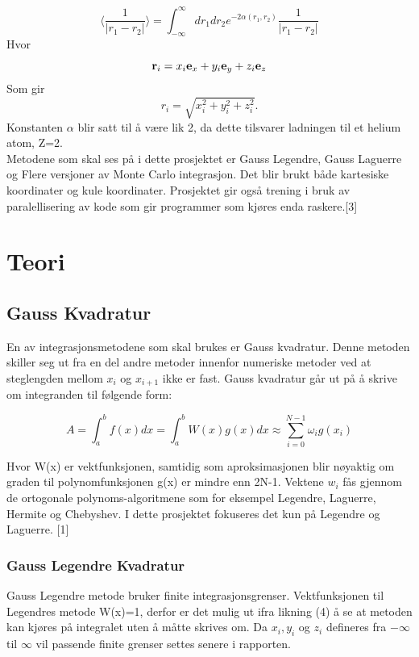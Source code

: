 \documentclass[%
oneside,                 %
final,                   %
10pt]{article}
\begin{document}
\begin{equation}
  \langle \frac{1}{\left| {r}_1 - {r}_2 \right|} \rangle = \int_{-\infty}^{\infty} dr_1dr_2 e^{-2\alpha(r_1, r_2)} \frac{1}{\left| {r}_1 - {r}_2 \right|}
\end{equation}
\noindent Hvor
\begin{equation}
	{\bf r}_i =  x_i {\bf e}_x + y_i {\bf e}_y +z_i {\bf e}_z
\end{equation}
\noindent Som gir
\begin{equation}
	r_i = \sqrt{x_i^2+y_i^2+z_i^2}.
\end{equation}
\noindent Konstanten $\alpha$ blir satt til å være lik 2, da dette tilsvarer ladningen til et helium atom, Z=2.\\
\noindent Metodene som skal ses på i dette prosjektet er Gauss Legendre, Gauss Laguerre og Flere versjoner av Monte Carlo integrasjon. Det blir brukt både kartesiske koordinater og kule koordinater.  Prosjektet gir også trening i bruk av paralellisering av kode som gir programmer som kjøres enda raskere.[3]

\section{Teori}

\subsection{Gauss Kvadratur}
\noindent En av integrasjonsmetodene som skal brukes er Gauss kvadratur. Denne metoden skiller seg ut fra en del andre metoder innenfor numeriske metoder ved at steglengden mellom $x_i$ og $x_{i+1}$ ikke er fast. Gauss kvadratur går ut på å skrive om integranden til følgende form:

\begin{equation}
	A=\int_a^b f(x)dx=\int_a^b W(x)g(x)dx \approx \sum_{i = 0}^{N-1} \omega_i g(x_i)
\end{equation}

\noindent Hvor W(x) er vektfunksjonen, samtidig som aproksimasjonen blir nøyaktig om graden til polynomfunksjonen g(x) er mindre enn 2N-1. Vektene $w_i$ fås gjennom de ortogonale polynoms-algoritmene som for eksempel Legendre, Laguerre, Hermite og Chebyshev. I dette prosjektet fokuseres det kun på Legendre og Laguerre. [1]
\subsubsection{Gauss Legendre Kvadratur}
\noindent Gauss Legendre metode bruker finite integrasjonsgrenser. Vektfunksjonen til Legendres metode W(x)=1, derfor er det mulig ut ifra likning (4) å se at metoden kan kjøres på integralet uten å måtte skrives om. Da $x_i, y_i$ og $z_i$ defineres fra $-\infty$ til $\infty$ vil passende finite grenser settes senere i rapporten.
\end{document}
